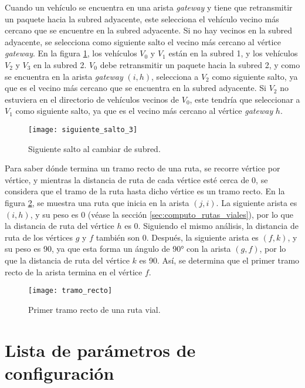 Cuando un vehículo se encuentra en una arista \textit{gateway} y tiene que
retransmitir un paquete hacia la subred adyacente, este selecciona el vehículo
vecino más cercano que se encuentre en la subred adyacente. Si no hay vecinos
en la subred adyacente, se selecciona como siguiente salto el vecino más
cercano al vértice \textit{gateway}. En la figura \ref{fig:siguiente_salto_3},
los vehículos $V_0$ y $V_1$ están en la subred 1, y los vehículos $V_2$ y $V_3$
en la subred 2. $V_0$ debe retransmitir un paquete hacia la subred 2, y como se
encuentra en la arista \textit{gateway} $(i,h)$, selecciona a $V_2$ como
siguiente salto, ya que es el vecino más cercano que se encuentra en la subred
adyacente. Si $V_2$ no estuviera en el directorio de vehículos vecinos de $V_0$,
este tendría que seleccionar a $V_1$ como siguiente salto, ya que es el vecino
más cercano al vértice \textit{gateway} $h$.

\begin{figure}[th!]
\centering
\texttt{[image: siguiente\_salto\_3]}
\decoRule
\caption[Siguiente salto al cambiar de subred]{Siguiente salto al cambiar de
subred.}
\label{fig:siguiente_salto_3}
\end{figure}

Para saber dónde termina un tramo recto de una ruta, se recorre vértice por
vértice, y mientras la distancia de ruta de cada vértice esté cerca de 0, se
considera que el tramo de la ruta hasta dicho vértice es un tramo recto. En la
figura \ref{fig:tramo_recto}, se muestra una ruta que inicia en la arista
$(j,i)$. La siguiente arista es $(i,h)$, y su peso es 0 (véase la sección
\ref{sec:computo_rutas_viales}), por lo que la distancia de ruta del vértice
$h$ es 0. Siguiendo el mismo análisis, la distancia de ruta de los vértices
$g$ y $f$ también son 0. Después, la siguiente arista es $(f,k)$, y su peso es
90, ya que esta forma un ángulo de 90\si{\degree} con la arista $(g,f)$, por lo
que la distancia de ruta del vértice $k$ es 90. Así, se determina que el primer
tramo recto de la arista termina en el vértice $f$.

\begin{figure}[th!]
\centering
\texttt{[image: tramo\_recto]}
\decoRule
\caption[Primer tramo recto de una ruta vial]{Primer tramo recto de una ruta
vial.}
\label{fig:tramo_recto}
\end{figure}

\section{Lista de parámetros de configuración}
\label{sec:lista_de_parametros_de_configuracion}

